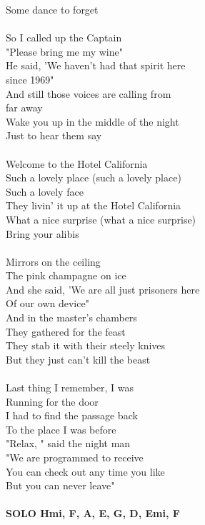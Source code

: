 \begin{multicols}{2}
Some dance to forget\\
\\
So I called up the Captain\\
"Please bring me my wine"\\
He said, 'We haven't had that spirit here\\
since 1969"\\
And still those voices are calling from\\
far away\\
Wake you up in the middle of the night\\
Just to hear them say\\
\\
Welcome to the Hotel California\\
Such a lovely place (such a lovely place)\\
Such a lovely face\\
They livin' it up at the Hotel California\\
What a nice surprise (what a nice surprise)\\
Bring your alibis\\
\\
Mirrors on the ceiling\\
The pink champagne on ice\\
And she said, 'We are all just prisoners here\\
Of our own device"\\
And in the master's chambers\\
They gathered for the feast\\
They stab it with their steely knives\\
But they just can't kill the beast\\
\\
Last thing I remember, I was\\
Running for the door\\
I had to find the passage back\\
To the place I was before\\
"Relax, " said the night man\\
"We are programmed to receive\\
You can check out any time you like\\
But you can never leave"\\
\\
\footnotesize\textbf{SOLO Hmi, F\kr \7, A, E, G, D, Emi, F\kr \7}
\normalsize
\end{multicols}